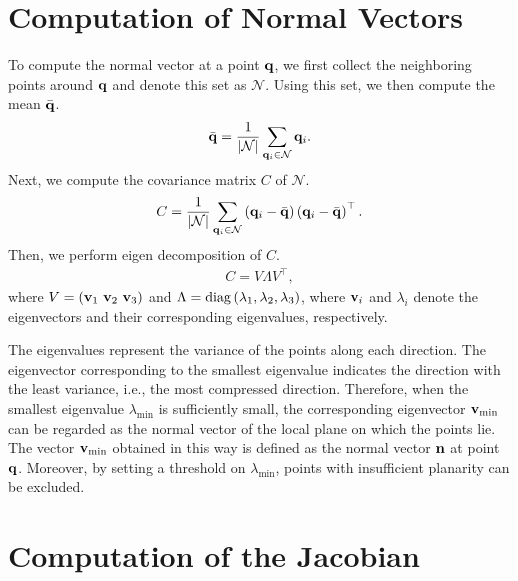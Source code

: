 \section{Computation of Normal Vectors}

To compute the normal vector at a point ${\bf q}$, we first collect the neighboring points around ${\bf q}$ and denote this set as $\mathcal{N}$.
Using this set, we then compute the mean $\bar{{\bf q}}$.
%
\begin{align}
  \bar{ {\bf q} } = \frac{1}{ | \mathcal{N} | } \sum_{ {\bf q}_{i} \in \mathcal{N} } {\bf q}_{i}.
  \label{eq:points_mean}
\end{align}
%
Next, we compute the covariance matrix $C$ of $\mathcal{N}$.
%
\begin{align}
  C = \frac{1}{ | \mathcal{N} | } \sum_{ {\bf q}_{i} \in \mathcal{N} } \left( {\bf q}_{i} - \bar{ {\bf q} } \right) \left( {\bf q}_{i} - \bar{ {\bf q} } \right)^{\top}.
  \label{eq:points_covariance}
\end{align}
%
Then, we perform eigen decomposition of $C$.
%
\begin{align}
  C = V \Lambda V^{\top},
\end{align}
%
where $V = \left( {\bf v}_{1} ~ {\bf v}_{2} ~ {\bf v}_{3} \right)$ and $\Lambda = {\rm diag} \left( \lambda_{1}, \lambda_{2}, \lambda_{3} \right)$, where ${\bf v}_{i}$ and $\lambda_{i}$ denote the eigenvectors and their corresponding eigenvalues, respectively.

The eigenvalues represent the variance of the points along each direction.
The eigenvector corresponding to the smallest eigenvalue indicates the direction with the least variance, i.e., the most compressed direction.
Therefore, when the smallest eigenvalue $\lambda_{\min}$ is sufficiently small, the corresponding eigenvector ${\bf v}_{\min}$ can be regarded as the normal vector of the local plane on which the points lie.
The vector ${\bf v}_{\min}$ obtained in this way is defined as the normal vector ${\bf n}$ at point ${\bf q}$.
Moreover, by setting a threshold on $\lambda_{\min}$, points with insufficient planarity can be excluded.










\section{Computation of the Jacobian}
\label{subsec:point_to_plane_jacobian}

